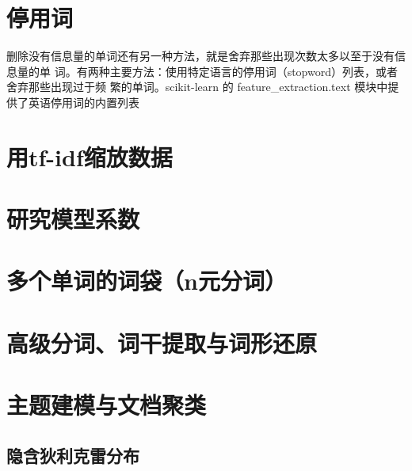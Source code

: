 \section{停用词}
删除没有信息量的单词还有另一种方法，就是舍弃那些出现次数太多以至于没有信息量的单
词。有两种主要方法：使用特定语言的停用词（stopword）列表，或者舍弃那些出现过于频
繁的单词。scikit-learn 的 feature_extraction.text 模块中提供了英语停用词的内置列表
\section{用tf-idf缩放数据}
\section{研究模型系数}
\section{多个单词的词袋（n元分词）}
\section{高级分词、词干提取与词形还原}
\section{主题建模与文档聚类}
\subsection{隐含狄利克雷分布}